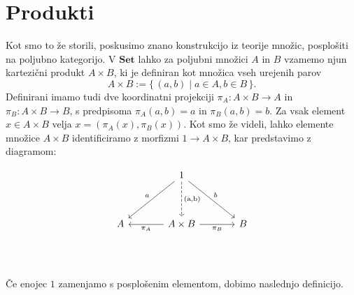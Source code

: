 \documentclass[12pt,a4paper]{book}
\theoremstyle{definition}
\theoremstyle{plain}
\theoremstyle{definition}
\theoremstyle{remark}
\newcommand{\cat}[1]{\textbf{#1}}
\renewcommand{\set}[1]{\{\,#1\,\}}
\begin{document}
\section{Produkti}
Kot smo to že storili, poskusimo znano konstrukcijo iz teorije množic, posplošiti na poljubno kategorijo. V $\cat{Set}$ lahko za poljubni množici $A$ in $B$ vzamemo njun kartezični produkt $A \times B$, ki je definiran kot množica vseh urejenih parov 
$$A \times B := \set{(a,b) \mid a \in A, b \in B}.$$
Definirani imamo tudi dve koordinatni projekciji $\pi_A : A\times B \to A$ in $\pi_B : A \times B \to B$, s predpisoma $\pi_A(a,b) = a$ in $\pi_B(a,b) = b$. Za vsak element $x \in A \times B$ velja $x = (\pi_A(x), \pi_B(x))$. Kot smo že videli, lahko elemente množice $A \times B$ identificiramo z morfizmi $1 \to A \times B$, kar predstavimo z diagramom:

$$ \begin{tikzcd}[row sep=huge, column sep=large]
&  1 \ar[dl, "a"'] \ar[d, dashed, "\text{(a,b)}", font=\large] \ar[dr, "b"] & \\
A & \ar[l, "\pi_A"] A \times B \ar[r, "\pi_B"'] & B \\
\end{tikzcd} $$

Če enojec $1$ zamenjamo s posplošenim elementom, dobimo naslednjo definicijo.
\end{document}
